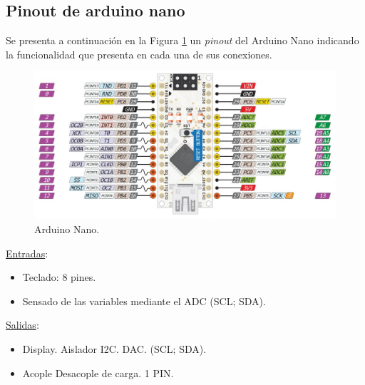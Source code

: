 \subsection{Pinout de arduino nano}
Se presenta a continuación en la Figura \ref{F:arduino_nano} un \textit{pinout} del Arduino Nano indicando la funcionalidad que presenta en cada una de sus conexiones.
\begin{figure}[H]
    \centering
    \includegraphics[scale=0.5]{./imagenes/arduino_nano.jpg}
    \caption{Arduino Nano.}
    \label{F:arduino_nano}
\end{figure}\par 
\underline{Entradas}:
\begin{itemize}
    \item Teclado: 8 pines. 
    \item Sensado de las variables mediante el ADC (SCL; SDA).
\end{itemize}\par 
\underline{Salidas}:
\begin{itemize}
    \item Display. Aislador I2C. DAC.  (SCL; SDA).
    \item Acople Desacople de carga. 1 PIN.
\end{itemize}\par 

